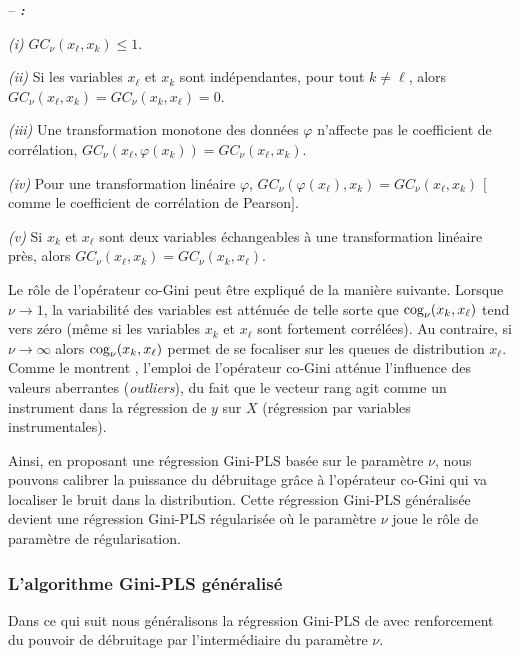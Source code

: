 \begin{property}\label{prop1} -- \textbf{\emph{\citet{Schechtman03}:}}
	
	\noindent \emph{(i)} $GC_\nu(x_\ell,x_k) \leq 1$.
	
	\noindent\emph{(ii)} Si les variables $x_\ell$ et $x_k$ sont indépendantes, pour tout $k\neq \ell$, alors $GC_\nu(x_\ell,x_k) = GC_\nu(x_k,x_\ell) =0$.
	
	\noindent\emph{(iii)} Une transformation monotone des données $\varphi$ n'affecte pas le coefficient de corrélation, $GC_\nu(x_\ell,\varphi(x_k)) = GC_\nu(x_\ell,x_k)$.
	
	\noindent\emph{(iv)} Pour une transformation linéaire $\varphi$, $GC_\nu(\varphi(x_\ell),x_k) = GC_\nu(x_\ell,x_k)$ $[$comme le coefficient de corrélation de Pearson$]$.
	
	\noindent\emph{(v)} Si $x_k$ et $x_\ell$ sont deux variables échangeables à une transformation linéaire près, alors $GC_\nu(x_\ell,x_k) = GC_\nu(x_k,x_\ell)$.
\end{property}

Le rôle de l'opérateur co-Gini peut être expliqué de la manière suivante. Lorsque $\nu \rightarrow 1$, la variabilité des variables est atténuée de telle sorte que $\text{cog}_\nu(x_k,x_\ell)$ tend vers zéro (même si les variables $x_k$ et $x_\ell$ sont fortement corrélées). Au contraire, si $\nu \rightarrow \infty $ alors $\text{cog}_\nu(x_k,x_\ell)$ permet de se focaliser sur les queues de distribution $x_\ell$. Comme le montrent \citet{olkin1992gini}, l'emploi de l'opérateur co-Gini atténue l'influence des valeurs aberrantes (\textit{outliers}), du fait que le vecteur rang agit comme un instrument dans la régression de $y$ sur $X$ (régression par variables instrumentales). 

Ainsi, en proposant une régression Gini-PLS basée sur le paramètre $\nu$, nous pouvons calibrer la puissance du débruitage grâce à l'opérateur co-Gini qui va localiser le bruit dans la distribution. Cette régression Gini-PLS généralisée devient une régression Gini-PLS régularisée où le paramètre $\nu$ joue le rôle de paramètre de régularisation. 


\subsubsection{L'algorithme Gini-PLS généralisé} 

Dans ce qui suit nous généralisons la régression Gini-PLS de \citet{mussard2018ginipls} avec renforcement du pouvoir de débruitage par l'intermédiaire du paramètre $\nu$.

